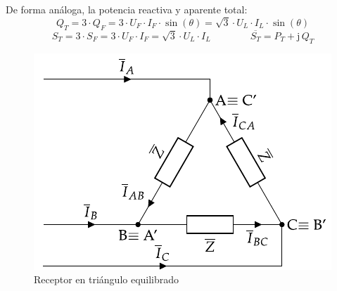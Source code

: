 \documentclass[11pt]{book} %
\begin{document}
	De forma análoga, la potencia reactiva y aparente total:
	\begin{equation}
	    \boxed{Q_T=3\cdot Q_F=3\cdot U_F\cdot {I_F}\cdot\sin(\theta)=\sqrt{3}\cdot U_L\cdot I_L\cdot\sin(\theta)}
	\end{equation}
	\begin{equation}
	    \boxed{S_T=3\cdot S_F=3\cdot U_F\cdot {I_F}=\sqrt{3}\cdot U_L\cdot I_L}  \qquad\qquad \boxed{\overline{S_T}=P_T+\mathrm{j}\,Q_T}
	\end{equation}
	
	\begin{figure}
	    \centering
	    \includegraphics{../figs/TrianguloEquilibrado_Receptor.pdf}
	    \caption{Receptor en triángulo equilibrado}
	    \label{fig.trianguloEquilibrado_receptor_potencia}
	\end{figure}
	
\end{document}
